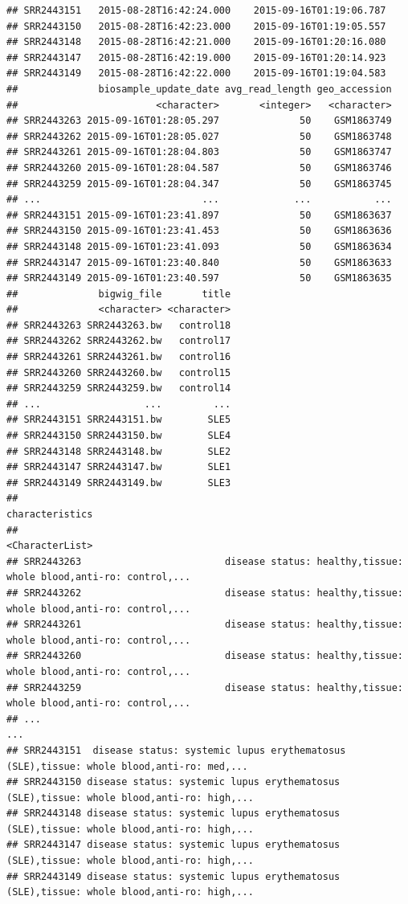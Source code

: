 \documentclass[9pt,a4paper,]{extarticle}
\begin{document}
\begin{verbatim}
## SRR2443151   2015-08-28T16:42:24.000    2015-09-16T01:19:06.787
## SRR2443150   2015-08-28T16:42:23.000    2015-09-16T01:19:05.557
## SRR2443148   2015-08-28T16:42:21.000    2015-09-16T01:20:16.080
## SRR2443147   2015-08-28T16:42:19.000    2015-09-16T01:20:14.923
## SRR2443149   2015-08-28T16:42:22.000    2015-09-16T01:19:04.583
##              biosample_update_date avg_read_length geo_accession
##                        <character>       <integer>   <character>
## SRR2443263 2015-09-16T01:28:05.297              50    GSM1863749
## SRR2443262 2015-09-16T01:28:05.027              50    GSM1863748
## SRR2443261 2015-09-16T01:28:04.803              50    GSM1863747
## SRR2443260 2015-09-16T01:28:04.587              50    GSM1863746
## SRR2443259 2015-09-16T01:28:04.347              50    GSM1863745
## ...                            ...             ...           ...
## SRR2443151 2015-09-16T01:23:41.897              50    GSM1863637
## SRR2443150 2015-09-16T01:23:41.453              50    GSM1863636
## SRR2443148 2015-09-16T01:23:41.093              50    GSM1863634
## SRR2443147 2015-09-16T01:23:40.840              50    GSM1863633
## SRR2443149 2015-09-16T01:23:40.597              50    GSM1863635
##              bigwig_file       title
##              <character> <character>
## SRR2443263 SRR2443263.bw   control18
## SRR2443262 SRR2443262.bw   control17
## SRR2443261 SRR2443261.bw   control16
## SRR2443260 SRR2443260.bw   control15
## SRR2443259 SRR2443259.bw   control14
## ...                  ...         ...
## SRR2443151 SRR2443151.bw        SLE5
## SRR2443150 SRR2443150.bw        SLE4
## SRR2443148 SRR2443148.bw        SLE2
## SRR2443147 SRR2443147.bw        SLE1
## SRR2443149 SRR2443149.bw        SLE3
##                                                                                     characteristics
##                                                                                     <CharacterList>
## SRR2443263                         disease status: healthy,tissue: whole blood,anti-ro: control,...
## SRR2443262                         disease status: healthy,tissue: whole blood,anti-ro: control,...
## SRR2443261                         disease status: healthy,tissue: whole blood,anti-ro: control,...
## SRR2443260                         disease status: healthy,tissue: whole blood,anti-ro: control,...
## SRR2443259                         disease status: healthy,tissue: whole blood,anti-ro: control,...
## ...                                                                                             ...
## SRR2443151  disease status: systemic lupus erythematosus (SLE),tissue: whole blood,anti-ro: med,...
## SRR2443150 disease status: systemic lupus erythematosus (SLE),tissue: whole blood,anti-ro: high,...
## SRR2443148 disease status: systemic lupus erythematosus (SLE),tissue: whole blood,anti-ro: high,...
## SRR2443147 disease status: systemic lupus erythematosus (SLE),tissue: whole blood,anti-ro: high,...
## SRR2443149 disease status: systemic lupus erythematosus (SLE),tissue: whole blood,anti-ro: high,...
\end{verbatim}
\end{document}
